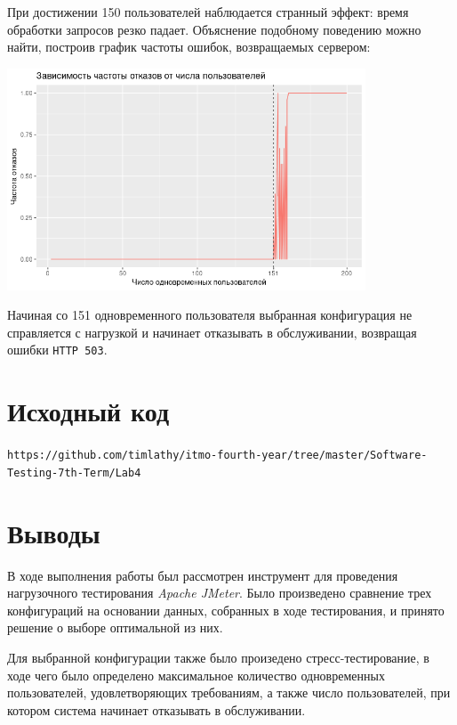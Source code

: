 \documentclass[listings]{labreport}
\begin{document}
При достижении 150 пользователей наблюдается странный эффект: время обработки
запросов резко падает. Объяснение подобному поведению можно найти, построив
график частоты ошибок, возвращаемых сервером:

\vspace{0.4em}
\includegraphics[width=0.8\textwidth]{Lab4/Stress-Test-Error-Rate-Plot.png}

Начиная со 151 одновременного пользователя выбранная конфигурация не справляется
с нагрузкой и начинает отказывать в обслуживании, возвращая ошибки \verb|HTTP 503|.

\section*{Исходный код}

\verb|https://github.com/timlathy/itmo-fourth-year/tree/master/Software-Testing-7th-Term/Lab4|

\section*{Выводы}

В ходе выполнения работы был рассмотрен инструмент для проведения нагрузочного тестирования
\textit{Apache JMeter}. Было произведено сравнение трех конфигураций на основании данных,
собранных в ходе тестирования, и принято решение о выборе оптимальной из них.

Для выбранной конфигурации также было произедено стресс-тестирование, в ходе чего было
определено максимальное количество одновременных пользователей, удовлетворяющих требованиям,
а также число пользователей, при котором система начинает отказывать в обслуживании.
\end{document}
